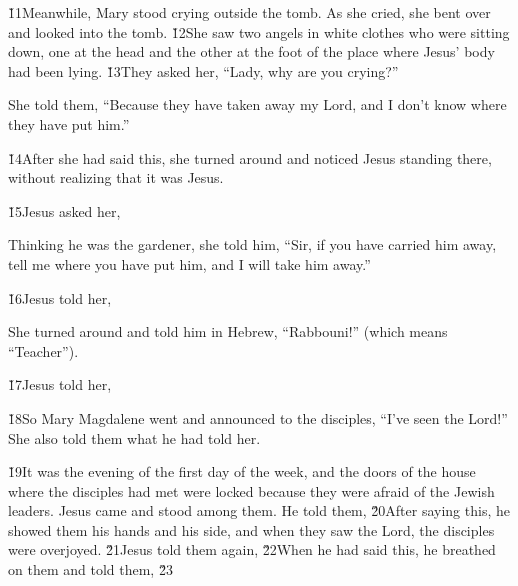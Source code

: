 \v{11}Meanwhile, Mary stood crying outside the tomb. As she cried, she bent over and looked into the tomb. \v{12}She saw two angels in white clothes who were sitting down, one at the head and the other at the foot of the place where Jesus' body had been lying. \v{13}They asked her, ``Lady, why are you crying?''

She told them, ``Because they have taken away my Lord, and I don't know where they have put him.''

\v{14}After she had said this, she turned around and noticed Jesus standing there, without realizing that it was Jesus.

\v{15}Jesus asked her, 

Thinking he was the gardener, she told him, ``Sir, if you have carried him away, tell me where you have put him, and I will take him away.''

\v{16}Jesus told her, 

She turned around and told him in Hebrew, ``Rabbouni!'' (which means ``Teacher'').

\v{17}Jesus told her, 

\v{18}So Mary Magdalene went and announced to the disciples, ``I've seen the Lord!'' She also told them what he had told her.

\v{19}It was the evening of the first day of the week, and the doors of the house where the disciples had met were locked because they were afraid of the Jewish leaders. Jesus came and stood among them. He told them,  \v{20}After saying this, he showed them his hands and his side, and when they saw the Lord, the disciples were overjoyed. \v{21}Jesus told them again,  \v{22}When he had said this, he breathed on them and told them,  \v{23}

